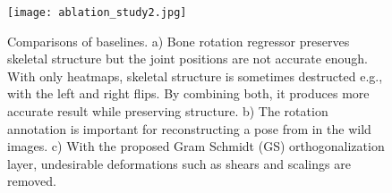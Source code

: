 \begin{table}[hbt]
	\footnotesize
	\begin{center}
		\caption{Comparison of rotation representation. }
		\label{tab:cmp_rotation}
	\end{center}
\end{table}

\begin{comment}
\begin{table}[hbt]
	\footnotesize
	\begin{center}
		\caption{Results on MPII validation dataset. PCK@0.5 is used for the error measure. }
		\label{tab:PCK}
		\scalebox{0.9}{
			\begin{tabular}{c c c c c c c c c}
				\hline & Head & Sho. & Elbow & Wrist & Hip & Knee & Ankle & Mean \\ 
				\hline 
				Pavlakos et al. (4 stacks) \cite{PavlakosZDD16} &  95.86& 93.05  &	85.73  & 80.42 & 81.29 & 79.31 & 75.41 & 84.96 \\   
				Ours ( 2 stacks)  & 93.86 & 89.2 & 71.18  & 79.92  & 74.49  & 72.15 & 79.85 & 79.99 \\
				\hline   
			\end{tabular}
		}
	\end{center}
\end{table}

\end{comment}					











\begin{figure}[tb]
	\centering
	\texttt{[image: ablation\_study2.jpg]}
	\caption{Comparisons of baselines. a) Bone rotation regressor preserves skeletal structure but the joint positions are not accurate enough. With only heatmaps, skeletal structure is sometimes destructed e.g., with the left and right flips. By combining both, it produces more accurate result while preserving structure. b) The rotation annotation is important for reconstructing a pose from in the wild images. c) With the proposed Gram Schmidt (GS) orthogonalization layer, undesirable deformations such as shears and scalings are removed. }
	\label{fig:Ablation_study}
\end{figure}



